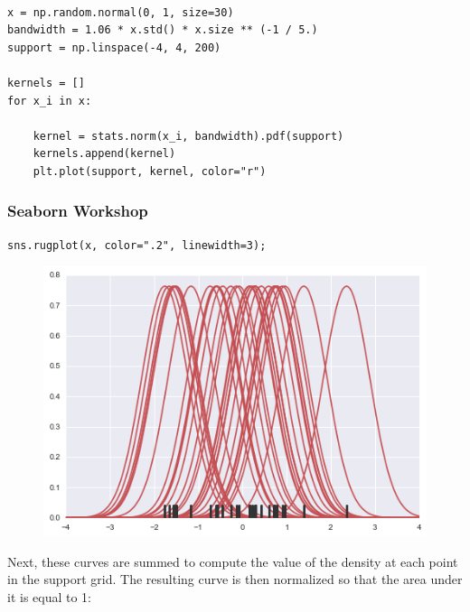 \documentclass{beamer}
\begin{document}
\begin{frame}[fragile]
\begin{framed}
\begin{verbatim}

x = np.random.normal(0, 1, size=30)
bandwidth = 1.06 * x.std() * x.size ** (-1 / 5.)
support = np.linspace(-4, 4, 200)

kernels = []
for x_i in x:

    kernel = stats.norm(x_i, bandwidth).pdf(support)
    kernels.append(kernel)
    plt.plot(support, kernel, color="r")

\end{verbatim}
\end{framed}
\end{frame}
\begin{frame}[fragile]
	\frametitle{Seaborn Workshop}
	\large
\begin{verbatim}
sns.rugplot(x, color=".2", linewidth=3);
\end{verbatim}
\begin{figure}
	\centering
	\includegraphics[width=0.7\linewidth]{images/distributions_16_0}
\end{figure}
Next, these curves are summed to compute the value of the density at each point in the support grid. The resulting curve is then normalized so that the area under it is equal to 1:

\end{frame}
\end{document}
